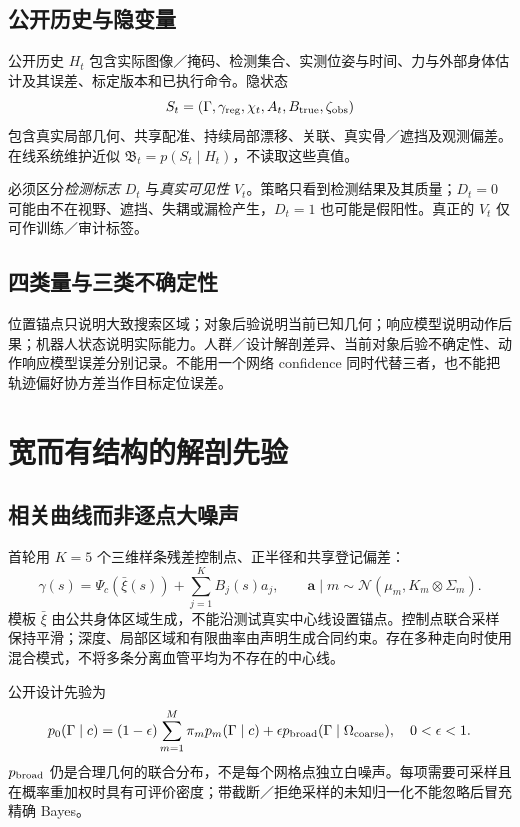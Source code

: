 \documentclass[UTF8,fontset=fandol,11pt,a4paper]{ctexart}
\theoremstyle{plain}
\theoremstyle{definition}
\theoremstyle{remark}
\numberwithin{equation}{section}
\newcommand{\B}{\mathfrak B}
\begin{document}
\subsection{公开历史与隐变量}
公开历史 $H_t$ 包含实际图像／掩码、检测集合、实测位姿与时间、力与外部身体估计及其误差、标定版本和已执行命令。隐状态
\begin{equation}
S_t=(\Gamma,\gamma_{\rm reg},\chi_t,A_t,B_{\rm true},\zeta_{\rm obs})
\end{equation}
包含真实局部几何、共享配准、持续局部漂移、关联、真实骨／遮挡及观测偏差。在线系统维护近似 $\B_t=p(S_t\mid H_t)$，不读取这些真值。

必须区分\emph{检测标志} $D_t$ 与\emph{真实可见性} $V_t$。策略只看到检测结果及其质量；$D_t=0$ 可能由不在视野、遮挡、失耦或漏检产生，$D_t=1$ 也可能是假阳性。真正的 $V_t$ 仅可作训练／审计标签。

\subsection{四类量与三类不确定性}
位置锚点只说明大致搜索区域；对象后验说明当前已知几何；响应模型说明动作后果；机器人状态说明实际能力。人群／设计解剖差异、当前对象后验不确定性、动作响应模型误差分别记录。不能用一个网络 confidence 同时代替三者，也不能把轨迹偏好协方差当作目标定位误差。

\section{宽而有结构的解剖先验}
\label{sec:prior}
\subsection{相关曲线而非逐点大噪声}
首轮用 $K=5$ 个三维样条残差控制点、正半径和共享登记偏差：
\begin{equation}
\gamma(s)=\Psi_c(\bar\xi(s))+\sum_{j=1}^{K}B_j(s)a_j,\qquad
\bm a\mid m\sim\mathcal N(\mu_m,K_m\otimes\Sigma_m).
\label{eq:curve}
\end{equation}
模板 $\bar\xi$ 由公共身体区域生成，不能沿测试真实中心线设置锚点。控制点联合采样保持平滑；深度、局部区域和有限曲率由声明生成合同约束。存在多种走向时使用混合模式，不将多条分离血管平均为不存在的中心线。

公开设计先验为
\begin{equation}
 p_0(\Gamma\mid c)=(1-\epsilon)\sum_{m=1}^{M}\pi_m p_m(\Gamma\mid c)
 +\epsilon p_{\rm broad}(\Gamma\mid\Omega_{\rm coarse}),\quad 0<\epsilon<1.
\label{eq:prior}
\end{equation}
$p_{\rm broad}$ 仍是合理几何的联合分布，不是每个网格点独立白噪声。每项需要可采样且在概率重加权时具有可评价密度；带截断／拒绝采样的未知归一化不能忽略后冒充精确 Bayes。
\end{document}
